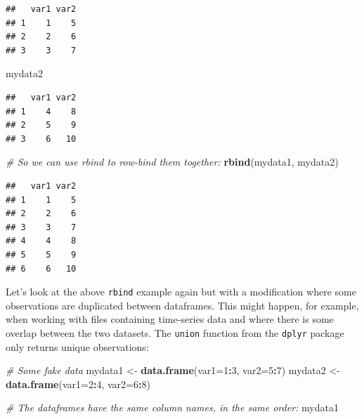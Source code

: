 \documentclass[]{book}
\newenvironment{Shaded}{\begin{snugshade}}{\end{snugshade}}
\newcommand{\CommentTok}[1]{\textcolor[rgb]{0.56,0.35,0.01}{\textit{#1}}}
\newcommand{\DataTypeTok}[1]{\textcolor[rgb]{0.13,0.29,0.53}{#1}}
\newcommand{\DecValTok}[1]{\textcolor[rgb]{0.00,0.00,0.81}{#1}}
\newcommand{\KeywordTok}[1]{\textcolor[rgb]{0.13,0.29,0.53}{\textbf{#1}}}
\newcommand{\NormalTok}[1]{#1}
\newcommand{\OperatorTok}[1]{\textcolor[rgb]{0.81,0.36,0.00}{\textbf{#1}}}
\newcommand{\StringTok}[1]{\textcolor[rgb]{0.31,0.60,0.02}{#1}}
\begin{document}
\begin{verbatim}
##   var1 var2
## 1    1    5
## 2    2    6
## 3    3    7
\end{verbatim}

\begin{Shaded}
\begin{Highlighting}[]
\NormalTok{mydata2}
\end{Highlighting}
\end{Shaded}

\begin{verbatim}
##   var1 var2
## 1    4    8
## 2    5    9
## 3    6   10
\end{verbatim}

\begin{Shaded}
\begin{Highlighting}[]
\CommentTok{# So we can use rbind to row-bind them together:}
\KeywordTok{rbind}\NormalTok{(mydata1, mydata2)}
\end{Highlighting}
\end{Shaded}

\begin{verbatim}
##   var1 var2
## 1    1    5
## 2    2    6
## 3    3    7
## 4    4    8
## 5    5    9
## 6    6   10
\end{verbatim}

Let's look at the above \texttt{rbind} example again but with a modification where some observations are duplicated between dataframes. This might happen, for example, when working with files containing time-series data and where there is some overlap between the two datasets. The \texttt{union} function from the \texttt{dplyr} package only returns unique observations:

\begin{Shaded}
\begin{Highlighting}[]
\CommentTok{# Some fake data}
\NormalTok{mydata1 <-}\StringTok{ }\KeywordTok{data.frame}\NormalTok{(}\DataTypeTok{var1=}\DecValTok{1}\OperatorTok{:}\DecValTok{3}\NormalTok{, }\DataTypeTok{var2=}\DecValTok{5}\OperatorTok{:}\DecValTok{7}\NormalTok{) }
\NormalTok{mydata2 <-}\StringTok{ }\KeywordTok{data.frame}\NormalTok{(}\DataTypeTok{var1=}\DecValTok{2}\OperatorTok{:}\DecValTok{4}\NormalTok{, }\DataTypeTok{var2=}\DecValTok{6}\OperatorTok{:}\DecValTok{8}\NormalTok{) }

\CommentTok{# The dataframes have the same column names, in the same order:}
\NormalTok{mydata1}
\end{Highlighting}
\end{Shaded}
\end{document}

